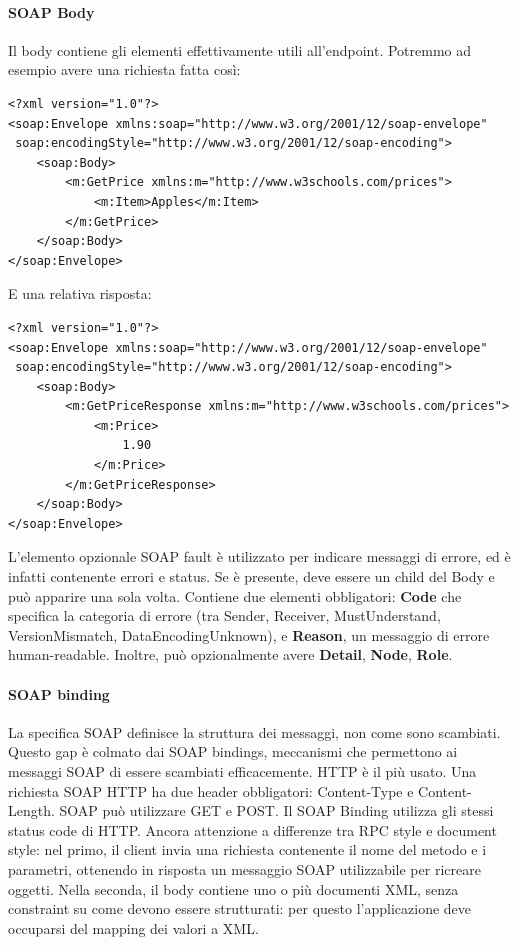 \documentclass[11pt]{article}
\begin{document}
\paragraph{SOAP Body} Il body contiene gli elementi effettivamente utili all'endpoint. Potremmo ad esempio avere una richiesta fatta così:
\begin{verbatim}
<?xml version="1.0"?>
<soap:Envelope xmlns:soap="http://www.w3.org/2001/12/soap-envelope" 
 soap:encodingStyle="http://www.w3.org/2001/12/soap-encoding">
    <soap:Body>
        <m:GetPrice xmlns:m="http://www.w3schools.com/prices">
            <m:Item>Apples</m:Item>
        </m:GetPrice>
    </soap:Body>
</soap:Envelope>
\end{verbatim}
E una relativa risposta:
\begin{verbatim}
<?xml version="1.0"?>
<soap:Envelope xmlns:soap="http://www.w3.org/2001/12/soap-envelope" 
 soap:encodingStyle="http://www.w3.org/2001/12/soap-encoding">
    <soap:Body>
        <m:GetPriceResponse xmlns:m="http://www.w3schools.com/prices">
            <m:Price>
                1.90
            </m:Price> 
        </m:GetPriceResponse>
    </soap:Body>
</soap:Envelope>
\end{verbatim}
L'elemento opzionale SOAP fault è utilizzato per indicare messaggi di errore, ed è infatti contenente errori e status. Se è presente, deve essere un child del Body e può apparire una sola volta. Contiene due elementi obbligatori: \textbf{Code} che specifica la categoria di errore (tra Sender, Receiver, MustUnderstand, VersionMismatch, DataEncodingUnknown), e \textbf{Reason}, un messaggio di errore human-readable. Inoltre, può opzionalmente avere \textbf{Detail}, \textbf{Node}, \textbf{Role}.
\paragraph{SOAP binding} La specifica SOAP definisce la struttura dei messaggi, non come sono scambiati. Questo gap è colmato dai SOAP bindings, meccanismi che permettono ai messaggi SOAP di essere scambiati efficacemente. HTTP è il più usato. Una richiesta SOAP HTTP ha due header obbligatori: Content-Type e Content-Length. SOAP può utilizzare GET e POST. Il SOAP Binding utilizza gli stessi status code di HTTP. Ancora attenzione a differenze tra RPC style e document style: nel primo, il client invia una richiesta contenente il nome del metodo e i parametri, ottenendo in risposta un messaggio SOAP utilizzabile per ricreare oggetti. Nella seconda, il body contiene uno o più documenti XML, senza constraint su come devono essere strutturati: per questo l'applicazione deve occuparsi del mapping dei valori a XML. 
\end{document}
